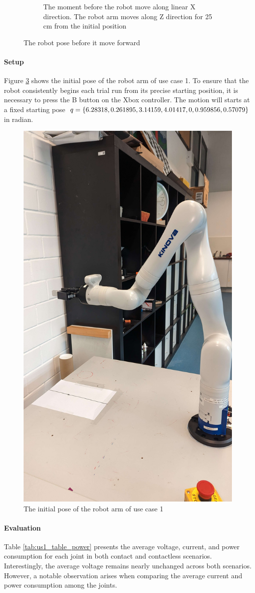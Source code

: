 \documentclass[report.tex]{subfiles}
\begin{document}
\begin{figure}[H]
\begin{subfigure}{0.49\textwidth}
                \caption{The moment before the robot move along linear X direction. The robot arm moves along Z direction for 25 cm from the initial position}
                \label{fig:us1_nocon}
            \end{subfigure}
            \caption{The robot pose before it move forward}
        \end{figure}
    \paragraph{\large{Setup}\\}
    Figure \ref{fig:us1_init} shows the initial pose of the robot arm of use case 1. To ensure that the robot consistently begins each trial run from its precise starting position, it is necessary to press the B button on the Xbox controller. The motion will starts at a fixed starting pose $q = \{6.28318,0.261895,3.14159,4.01417,0,\\0.959856,0.57079\}$ in radian.
    \begin{figure}[H]
        \centering
        \includegraphics[width=0.4\linewidth]{images/us1_initial.jpg}
        \caption{The initial pose of the robot arm of use case 1}
        \label{fig:us1_init}
    \end{figure}
    \paragraph{\large{Evaluation}\\}
    Table \ref{tab:us1_table_power} presents the average voltage, current, and power consumption for each joint in both contact and contactless scenarios. Interestingly, the average voltage remains nearly unchanged across both scenarios. However, a notable observation arises when comparing the average current and power consumption among the joints.
\end{document}

